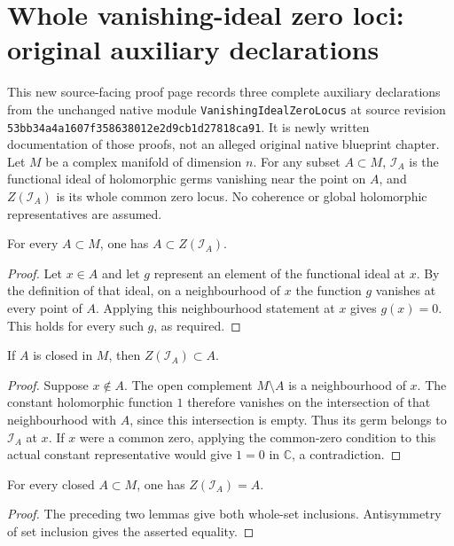 \section{Whole vanishing-ideal zero loci: original auxiliary declarations}

This new source-facing proof page records three complete auxiliary declarations
from the unchanged native module \texttt{VanishingIdealZeroLocus} at source
revision \texttt{53bb34a4a1607f358638012e2d9cb1d27818ca91}. It is newly written
documentation of those proofs, not an alleged original native blueprint
chapter. Let $M$ be a complex manifold of dimension $n$. For any subset
$A\subset M$, $\mathcal I_A$ is the functional ideal of holomorphic germs
vanishing near the point on $A$, and $Z(\mathcal I_A)$ is its whole common zero
locus. No coherence or global holomorphic representatives are assumed.

\begin{lemma}
\label{pub:vanishing-zero-locus-subset}
\notready
For every $A\subset M$, one has $A\subset Z(\mathcal I_A)$.
\end{lemma}
\begin{proof}
Let $x\in A$ and let $g$ represent an element of the functional ideal at $x$.
By the definition of that ideal, on a neighbourhood of $x$ the function $g$
vanishes at every point of $A$. Applying this neighbourhood statement at $x$
gives $g(x)=0$. This holds for every such $g$, as required.
\end{proof}

\begin{lemma}
\label{pub:vanishing-zero-locus-reverse}
\notready
If $A$ is closed in $M$, then $Z(\mathcal I_A)\subset A$.
\end{lemma}
\begin{proof}
Suppose $x\notin A$. The open complement $M\setminus A$ is a neighbourhood
of $x$. The constant holomorphic function $1$ therefore vanishes on the
intersection of that neighbourhood with $A$, since this intersection is empty.
Thus its germ belongs to $\mathcal I_A$ at $x$. If $x$ were a common zero,
applying the common-zero condition to this actual constant representative
would give $1=0$ in $\mathbb C$, a contradiction.
\end{proof}

\begin{theorem}
\label{pub:vanishing-zero-locus-whole}
\notready
For every closed $A\subset M$, one has $Z(\mathcal I_A)=A$.
\end{theorem}
\begin{proof}
The preceding two lemmas give both whole-set inclusions. Antisymmetry of set
inclusion gives the asserted equality.
\end{proof}
